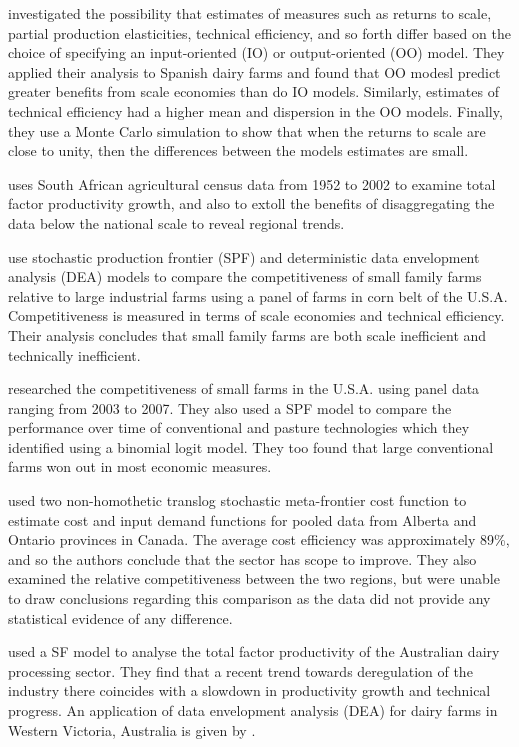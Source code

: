 \documentclass{report}
\begin{document}
\citet{kumbhakar08a} investigated the possibility that estimates of measures such as returns to scale, partial production elasticities, technical efficiency, and so forth differ based on the choice of specifying an input-oriented (IO) or output-oriented (OO) model. They applied their analysis to Spanish dairy farms and found that OO modesl predict greater benefits from scale economies than do IO models. Similarly, estimates of technical efficiency had a higher mean and dispersion in the OO models. Finally, they use a Monte Carlo simulation to show that when the returns to scale are close to unity, then the differences between the models estimates are small. 

\citet{conradie09} uses South African agricultural census data from 1952 to 2002 to examine total factor productivity growth, and also to extoll the benefits of disaggregating the data below the national scale to reveal regional trends.

\citet{paul04} use stochastic production frontier (SPF) and deterministic data envelopment analysis (DEA) models to compare the competitiveness of small family farms relative to large industrial farms using a panel of farms in corn belt of the U.S.A. Competitiveness is measured in terms of scale economies and technical efficiency. Their analysis concludes that small family farms are both scale inefficient and technically inefficient.

\citet{nehring09} researched the competitiveness of small farms in the U.S.A. using panel data ranging from 2003 to 2007. They also used a SPF model to compare the performance over time of conventional and pasture technologies which they identified using a binomial logit model. They too found that large conventional farms won out in most economic measures. 

\citet{hailu05} used two non-homothetic translog stochastic meta-frontier cost function to estimate cost and input demand functions for pooled data from Alberta and Ontario provinces in Canada. The average cost efficiency was approximately 89\%, and so the authors conclude that the sector has scope to improve. They also examined the relative competitiveness between the two regions, but were unable to draw conclusions regarding this comparison as the data did not provide any statistical evidence of any difference. 

\citet{douc00} used a SF model to analyse the total factor productivity of the Australian dairy processing sector. They find that a recent trend towards deregulation of the industry there coincides with a slowdown in productivity growth and technical progress. An application of data envelopment analysis (DEA) for dairy farms in Western Victoria, Australia is given by \citet{carter10}. 
\end{document}
